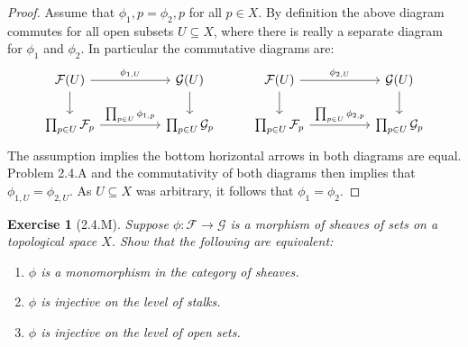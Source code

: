 \documentclass{amsart}
\newtheorem*{exercise*}{Exercise}
\begin{document}
\begin{proof}
	    Assume that $\phi_1,p=\phi_2,p$ for all $p\in X$. By definition the above diagram commutes for all open subsets $U\subseteq X$, where there is really a separate diagram for $\phi_1$ and $\phi_2$. In particular the commutative diagrams are:
    \begin{equation*}
        \begin{tikzcd}
            \mathcal{F}(U) \arrow[rr, "\phi_{1,U}"] \arrow[d] & & \mathcal{G}(U) \arrow[d] & \mathcal{F}(U) \arrow[rr, "\phi_{2,U}"] \arrow[d] & & \mathcal{G}(U) \arrow[d] \\
            \prod_{p\in U}\mathcal{F}_p \arrow[rr, "\prod_{p\in U}\phi_{1,p}"] & & \prod_{p\in U}\mathcal{G}_p & \prod_{p\in U}\mathcal{F}_p \arrow[rr, "\prod_{p\in U}\phi_{2,p}"] & & \prod_{p\in U}\mathcal{G}_p
        \end{tikzcd}
    \end{equation*}
    The assumption implies the bottom horizontal arrows in both diagrams are equal. Problem 2.4.A and the commutativity of both diagrams then implies that $\phi_{1, U}=\phi_{2, U}$. As $U\subseteq X$ was arbitrary, it follows that $\phi_1=\phi_2$.
\end{proof}

\vspace{0.1in}


\begin{exercise*}[2.4.M]
    Suppose $\phi: \mathcal{F} \to \mathcal{G}$ is a morphism of sheaves of sets on a 
    topological space $X$. Show that the following are equivalent:
    \begin{enumerate}
        \item $\phi$ is a monomorphism in the category of sheaves.
        \item $\phi$ is injective on the level of stalks.
        \item $\phi$ is injective on the level of open sets.
    \end{enumerate}
\end{exercise*}
\end{document}

